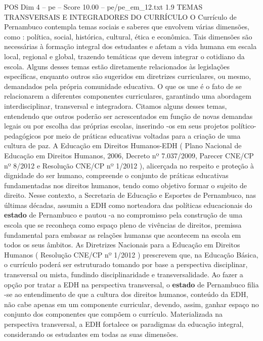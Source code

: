 \begin{textsample}{POS Dim 4 – pe – Score 10.00 – pe/pe\_em\_12.txt}  \label{ex:f4_pos_273}
1.9 TEMAS TRANSVERSAIS E INTEGRADORES DO CURRÍCULO O Currículo de Pernambuco contempla temas sociais e saberes que envolvem várias dimensões, como : política, social, histórica, cultural, ética e econômica.
Tais dimensões são necessárias à formação integral dos estudantes e afetam a vida humana em escala local, regional e global, trazendo temáticas que devem integrar o cotidiano da escola.
Alguns desses temas estão diretamente relacionados às legislações específicas, enquanto outros são sugeridos em diretrizes curriculares, ou mesmo, demandados pela própria comunidade educativa.
O que os une é o fato de se relacionarem a diferentes componentes curriculares, garantindo uma abordagem interdisciplinar, transversal e integradora.
Citamos alguns desses temas, entendendo que outros poderão ser acrescentados em função de novas demandas legais ou por escolha das próprias escolas, inserindo -os em seus projetos político-pedagógicos por meio de práticas educativas voltadas para a criação de uma cultura de paz.
A Educação em Direitos Humanos-EDH ( Plano Nacional de Educação em Direitos Humanos, 2006, Decreto nº 7.037/2009, Parecer CNE/CP nº 8/2012 e Resolução CNE/CP nº 1/2012 ), alicerçada no respeito e proteção à dignidade do ser humano, compreende o conjunto de práticas educativas fundamentadas nos direitos humanos, tendo como objetivo formar o sujeito de direito.
Nesse contexto, a Secretaria de Educação e Esportes de Pernambuco, nas últimas décadas, assumiu a EDH como norteadora das políticas educacionais do \textbf{estado} de Pernambuco e pautou -a no compromisso pela construção de uma escola que se reconheça como espaço pleno de vivências de direitos, premissa fundamental para embasar as relações humanas que acontecem na escola em todos os seus âmbitos.
As Diretrizes Nacionais para a Educação em Direitos Humanos ( Resolução CNE/CP nº 1/2012 ) prescrevem que, na Educação Básica, o currículo poderá ser estruturado tomando por base a perspectiva disciplinar, transversal ou mista, fundindo disciplinaridade e transversalidade.
Ao fazer a opção por tratar a EDH na perspectiva transversal, o \textbf{estado} de Pernambuco filia -se ao entendimento de que a cultura dos direitos humanos, conteúdo da EDH, não cabe apenas em um componente curricular, devendo, assim, ganhar espaço no conjunto dos componentes que compõem o currículo.
Materializada na perspectiva transversal, a EDH fortalece os paradigmas da educação integral, considerando os estudantes em todas as suas dimensões.

\end{textsample}
